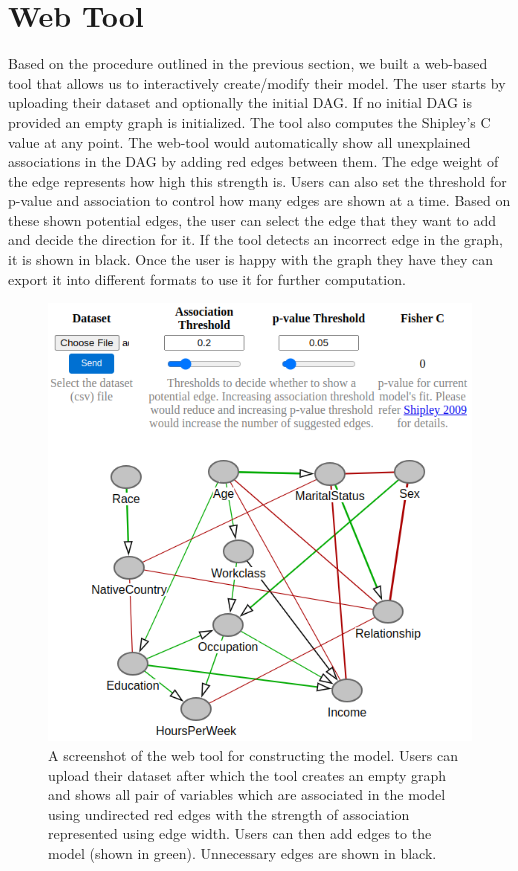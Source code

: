\documentclass{uai2025} %
\begin{document}
\section{Web Tool}
\label{sec:web}
Based on the procedure outlined in the previous section, we built a web-based
tool that allows us to interactively create/modify their model. The user
starts by uploading their dataset and optionally the initial DAG. If no initial
DAG is provided an empty graph is initialized. The tool also computes the
Shipley's C value at any point. The web-tool would automatically show all
unexplained associations in the DAG by adding red edges between them. The edge
weight of the edge represents how high this strength is. Users can also set the
threshold for p-value and association to control how many edges are shown at a
time. Based on these shown potential edges, the user can select the edge that
they want to add and decide the direction for it. If the tool detects an
incorrect edge in the graph, it is shown in black. Once the user is happy with
the graph they have they can export it into different formats to use it for
further computation.

\begin{figure}
	\centering
	\includegraphics[scale=0.4]{../code/plots/web_tool_full.png}
	\caption{A screenshot of the web tool for constructing the model. Users
		can upload their dataset after which the tool creates an empty
		graph and shows all pair of variables which are associated in
		the model using undirected red edges with the strength of
		association represented using edge width. Users can then add
		edges to the model (shown in green). Unnecessary edges are shown in 
		black.}
\end{figure}
\end{document}

